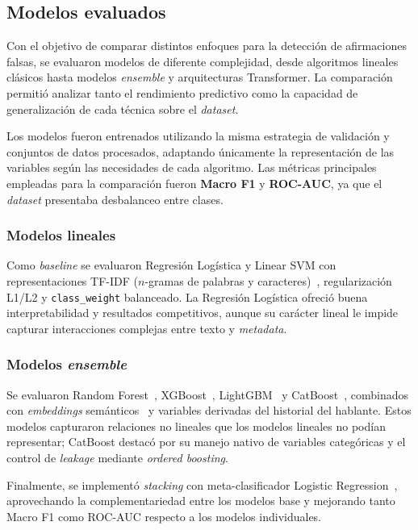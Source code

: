 \documentclass[12pt,a4paper]{article}
\begin{document}
\subsection{Modelos evaluados}

Con el objetivo de comparar distintos enfoques para la detección de afirmaciones falsas, se evaluaron modelos de diferente complejidad, desde algoritmos lineales clásicos hasta modelos \emph{ensemble} y arquitecturas Transformer. La comparación permitió analizar tanto el rendimiento predictivo como la capacidad de generalización de cada técnica sobre el \emph{dataset}.

Los modelos fueron entrenados utilizando la misma estrategia de validación y conjuntos de datos procesados, adaptando únicamente la representación de las variables según las necesidades de cada algoritmo. Las métricas principales empleadas para la comparación fueron \textbf{Macro F1} y \textbf{ROC-AUC}, ya que el \emph{dataset} presentaba desbalanceo entre clases.

\subsubsection{Modelos lineales}

Como \emph{baseline} se evaluaron Regresión Logística y Linear SVM con representaciones TF-IDF ($n$-gramas de palabras y caracteres)~\cite{sklearn}, regularización L1/L2 y \texttt{class\_weight} balanceado. La Regresión Logística ofreció buena interpretabilidad y resultados competitivos, aunque su carácter lineal le impide capturar interacciones complejas entre texto y \emph{metadata}.

\subsubsection{Modelos \emph{ensemble}}

Se evaluaron Random Forest~\cite{sklearn}, XGBoost~\cite{xgboost}, LightGBM~\cite{lgbm} y CatBoost~\cite{catboost}, combinados con \emph{embeddings} semánticos~\cite{sbert} y variables derivadas del historial del hablante. Estos modelos capturaron relaciones no lineales que los modelos lineales no podían representar; CatBoost destacó por su manejo nativo de variables categóricas y el control de \emph{leakage} mediante \emph{ordered boosting}.

Finalmente, se implementó \emph{stacking} con meta-clasificador Logistic Regression~\cite{sklearn}, aprovechando la complementariedad entre los modelos base y mejorando tanto Macro F1 como ROC-AUC respecto a los modelos individuales.
\end{document}
